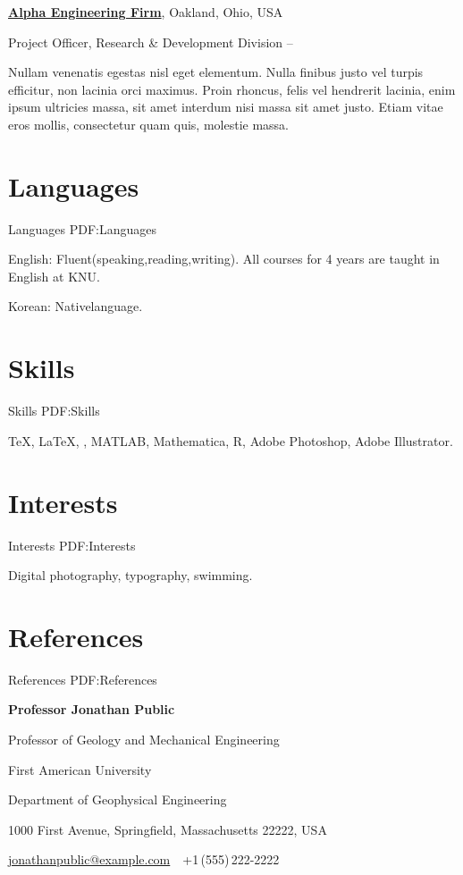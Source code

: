 \documentclass[a4paper,10pt,oneside]{article}
\begin{document}
\begin{body}
\href{http://www.example.com/my-company}
{\textbf{Alpha Engineering Firm}},
Oakland, Ohio, USA
\par
Project Officer,
Research \& Development Division
\hfill
{} --
\begin{detail}
\BulletItem
Nullam venenatis egestas nisl eget elementum.
\BulletItem
Nulla finibus justo vel turpis efficitur, non lacinia orci maximus. Proin rhoncus, felis vel hendrerit lacinia, enim ipsum ultricies massa, sit amet interdum nisi massa sit amet justo.
\BulletItem
Etiam vitae eros mollis, consectetur quam quis, molestie massa.
\end{detail}



\section
{Languages}
{Languages}
{PDF:Languages}

English: Fluent(speaking,reading,writing). All courses for 4 years are taught in English at KNU.
\par
Korean: Nativelanguage.


\section
{Skills}
{Skills}
{PDF:Skills}

{\TeX}, {\LaTeX}, {\XeLaTeX},
MATLAB,
Mathematica,
R,
Adobe Photoshop,
Adobe Illustrator.


\section
{Interests}
{Interests}
{PDF:Interests}

Digital photography,
typography,
swimming.


\section
{References}
{References}
{PDF:References}

\textbf{Professor Jonathan Public}
\par
Professor of Geology and Mechanical Engineering
\begin{detail}
First American University
\par
Department of Geophysical Engineering
\par
1000 First Avenue, Springfield, Massachusetts 22222, USA
\par
\href{mailto:jonathanpublic@example.com}
{jonathanpublic@example.com}
\,\BulletSymbol\,
+1\,(555)\,222-2222
\end{detail}


\end{body}
\end{document}
